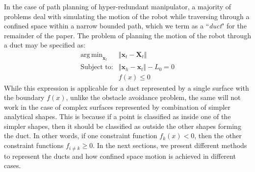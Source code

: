 \documentclass[12pt,a4]{article}
\DeclareMathOperator*{\argmin}{arg\,min}
\begin{document}
In the case of path planning of hyper-redundant manipulator, a majority of problems deal with simulating the motion of the robot while traversing through a confined space within a narrow bounded path, which we term as a ``\textit{duct}" for the remainder of the paper. The problem of planning the motion of the robot through a duct may be specified as:
\begin{align} \label{eq:path_planning_opt}
\argmin_{\textbf{x}_t} &\Vert \textbf{x}_t-\textbf{X}_t \Vert\\
\text{Subject to:} &\Vert \textbf{x}_h - \textbf{x}_t \Vert -L_0 = 0 \nonumber \\
 ~~ &{f}(x) \leq 0 \nonumber
\end{align}
While this expression is applicable for a duct represented by a single surface with the boundary $f(x)$, unlike the obstacle avoidance problem, the same will not work in the case of complex surfaces represented by combination of simpler analytical shapes. This is because if a point is classified as inside one of the simpler shapes, then it should be classified as outside the other shapes forming the duct. In other words, if one constraint function $f_k(x)< 0$, then the other constraint functions $f_{i\neq k}\geq 0$. In the next sections, we present different methods to represent the ducts and how confined space motion is achieved in different cases. 
\end{document}
